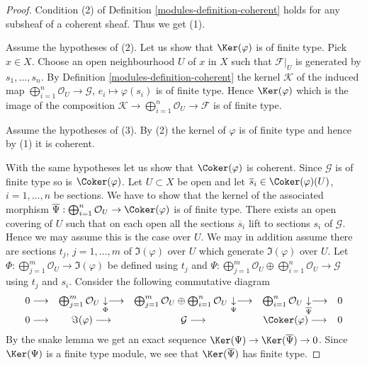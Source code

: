 \begin{proof}

Condition (2) of Definition \ref{modules-definition-coherent}
holds for any subsheaf of a coherent sheaf. Thus we get (1).

\medskip\noindent
Assume the hypotheses of (2).
Let us show that $\Ker(\varphi)$ is of finite type. Pick $x \in X$.
Choose an open neighbourhood $U$ of $x$ in $X$ such
that $\mathcal{F}|_U$ is generated by $s_1, \ldots, s_n$.
By Definition \ref{modules-definition-coherent} the kernel $\mathcal{K}$
of the induced map
$\bigoplus_{i = 1}^n \mathcal{O}_U \to \mathcal{G}$,
$e_i \mapsto \varphi(s_i)$ is of finite type.
Hence $\Ker(\varphi)$ which is the image of the
composition
$\mathcal{K} \to \bigoplus_{i = 1}^n \mathcal{O}_U \to \mathcal{F}$
is of finite type.

\medskip\noindent
Assume the hypotheses of (3).
By (2) the kernel of $\varphi$ is of finite type and
hence by (1) it is coherent.

\medskip\noindent
With the same hypotheses let us show that $\Coker(\varphi)$ is coherent.
Since $\mathcal{G}$ is of finite type so is $\Coker(\varphi)$.
Let $U \subset X$ be open and let $\overline{s}_i \in \Coker(\varphi)(U)$,
$i = 1, \ldots, n$ be sections. We have to show that the kernel of the
associated morphism
$\overline{\Psi} : \bigoplus_{i = 1}^n \mathcal{O}_U \to \Coker(\varphi)$
is of finite type. There exists an open covering
of $U$ such that on each open all the sections $\overline{s}_i$
lift to sections $s_i$ of $\mathcal{G}$. Hence we may assume
this is the case over $U$. We may in addition assume there are
sections $t_j$, $j = 1, \ldots, m$ of $\Im(\varphi)$ over $U$
which generate $\Im(\varphi)$ over $U$.
Let $\Phi : \bigoplus_{j = 1}^m \mathcal{O}_U \to \Im(\varphi)$
be defined using $t_j$ and
$\Psi :
\bigoplus_{j = 1}^m \mathcal{O}_U \oplus
\bigoplus_{i = 1}^n \mathcal{O}_U \to \mathcal{G}$
using $t_j$ and $s_i$.
Consider the following commutative diagram
$$
\begin{array}{ccccc}0 \longrightarrow & \bigoplus_{j = 1}^m \mathcal{O}_U \underset{\Phi}{\downarrow}\longrightarrow & \bigoplus_{j = 1}^m \mathcal{O}_U \oplus
\bigoplus_{i = 1}^n \mathcal{O}_U \underset{\Psi}{\downarrow}\longrightarrow & \bigoplus_{i = 1}^n \mathcal{O}_U \underset{\overline{\Psi}}{\downarrow}\longrightarrow & 0 \\ 0 \longrightarrow & \Im(\varphi) \longrightarrow & \mathcal{G} \longrightarrow & \Coker(\varphi) \longrightarrow & 0\end{array}
$$
By the snake lemma we get an exact sequence
$\Ker(\Psi) \to \Ker(\overline{\Psi}) \to 0$. Since $\Ker(\Psi)$
is a finite type module, we see that $\Ker(\overline{\Psi})$ has finite type.


\end{proof}
